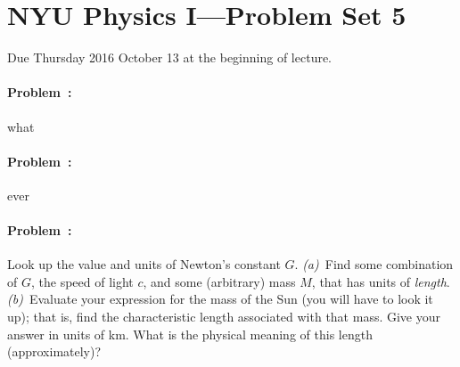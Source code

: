 \documentclass[12pt]{article}
\begin{document}
\section*{NYU Physics I---Problem Set 5}

Due Thursday 2016 October 13 at the beginning of lecture.

\paragraph{Problem~\theproblem:}%
what

\paragraph{Problem~\theproblem:}%
ever

\paragraph{Problem~\theproblem:}%
Look up the value and units of Newton's constant $G$.
\textsl{(a)}~Find some combination of $G$, the speed of light $c$, and
some (arbitrary) mass $M$, that has units of \emph{length}.
\textsl{(b)}~Evaluate your expression for the mass of the Sun (you
will have to look it up); that is, find the characteristic length
associated with that mass.  Give your answer in units of km.  What is
the physical meaning of this length (approximately)?
\end{document}
